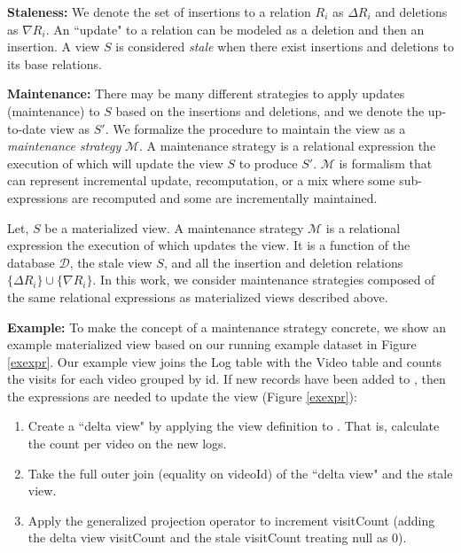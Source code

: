 \noindent \textbf{Staleness: } We denote the set of insertions to a relation $R_i$ as $\Delta R_i$ and deletions as $\nabla R_i$.
An ``update" to a relation can be modeled as a deletion and then an insertion.
A view $S$ is considered \emph{stale} when there exist insertions and deletions to its base relations.

\noindent \textbf{Maintenance: } There may be many different strategies to apply updates (maintenance) to $S$ based on the insertions and deletions, and we denote the up-to-date view as $S'$.
We formalize the procedure to maintain the view as a \emph{maintenance strategy} $\mathcal{M}$.
A maintenance strategy is a relational expression the execution of which will update the view $S$ to produce $S'$.
$\mathcal{M}$ is formalism that can represent incremental update, recomputation, or a mix where some sub-expressions are recomputed and some are incrementally maintained. 

Let, $S$ be a materialized view.
A maintenance strategy $\mathcal{M}$ is a relational expression the execution of which updates the view.
It is a function of the database $\mathcal{D}$, the stale view $S$, and all the insertion and deletion relations $\{\Delta R_i\} \cup \{\nabla R_i\}$.
In this work, we consider maintenance strategies composed of the same relational expressions as materialized views described above.

\noindent \textbf{Example: }
To make the concept of a maintenance strategy concrete, we show an example materialized view based on our running example dataset in Figure \ref{exexpr}.
Our example view joins the Log table with the Video table and counts the visits for each video grouped by id.
If new records have been added to , then the expressions are needed to update the view (Figure \ref{exexpr}):
\begin{enumerate}[noitemsep]
\item Create a ``delta view" by applying the view definition to . That is, calculate the count 
per video on the new logs.
\item Take the full outer join (equality on \textsf{videoId}) of the ``delta view" and the stale view.
\item Apply the generalized projection operator to increment \textsf{visitCount} (adding the delta view \textsf{visitCount} and the stale \textsf{visitCount} treating null as 0).
\end{enumerate}

